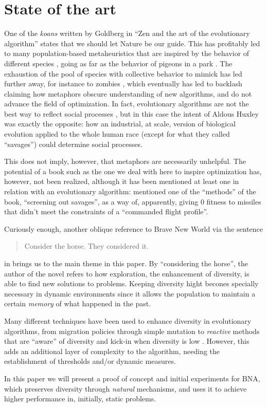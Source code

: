 \section{State of the art}


One of the {\em koans} written by Goldberg in ``Zen and the art of the
evolutionary algorithm'' states that we should let Nature be our guide. This has
profitably led to many population-based metaheuristics that are
inspired by the behavior of different species \cite{nedjah2020inspiration}, going as far as the behavior of
pigeons in a park \cite{blanco2019urban}. The exhaustion of the pool of
species with collective behavior to mimick has led further away, for instance to
zombies \cite{nguyen2012zombie}, which eventually has led to backlash
\cite{metaphor_exposed} claiming how metaphors obscure understanding of new
algorithms, and do not advance the field of optimization. In fact, evolutionary
algorithms are not the best way to reflect social processes
\cite{chattoe1998just}, but in this case the intent of Aldous Huxley was exactly
the opposite: how an industrial, at scale, version of biological evolution
applied to the whole human race (except for what they called ``savages'')
could determine social processes.

This does not imply, however, that metaphors are necessarily
unhelpful. The potential of a book such as the one we deal with here to inspire
optimization has, however, not been realized, although it has been
mentioned at least one in relation with an evolutionary algorithm:
\cite{wollam1999reverse} mentioned one of the ``methods'' of the book,
``screening out savages'', as a way of, apparently, giving 0 fitness
to missiles that didn't meet the constraints of a ``commanded flight
profile''.

Curiously enough, another oblique reference to Brave New World via the
sentence
\begin{quote}
  Consider the horse. They considered it.
\end{quote}
in \cite{DBLP:journals/corr/abs-2107-00314} brings us to the main
theme in this paper. By ``considering the horse'', the author of the
novel refers to how exploration, the enhancement of diversity, is able
to find new solutions to problems. Keeping diversity hight becones specially
necessary in dynamic environments \cite{cruz2011optimization} since it allows
the population to maintain a certain {\em memory} of what happened in the past.

Many different techniques have been used to enhance diversity in evolutionary
algorithms, from migration policies \cite{10.1007/978-3-642-29178-4_6} through
simple mutation \cite{jackson2011mutation} to {\em
  reactive} methods that are ``aware'' of diversity and kick-in when diversity
is low \cite{zaharie2006diversity}. However, this adds an additional layer of
complexity to the algorithm, needing the establishment of thresholds and/or
dynamic measures.

In this paper we will present a proof of concept and initial experiments for
{\sf BNA}, which preserves diversity through {\em natural} mechanisms, and uses
it to achieve higher performance in, initially, static problems.
